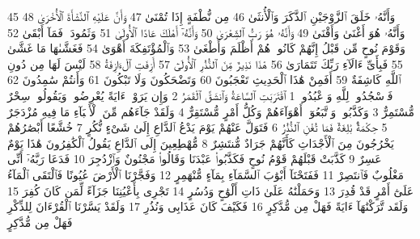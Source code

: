 {\tiny\colorbox{cl_aya}{45}} وَأَنَّهُۥ خَلَقَ ٱلزَّوْجَيْنِ ٱلذَّكَرَ وَٱلْأُنثَىٰ
{\tiny\colorbox{cl_aya}{46}} مِن نُّطْفَةٍ إِذَا تُمْنَىٰ
{\tiny\colorbox{cl_aya}{47}} وَأَنَّ عَلَيْهِ ٱلنَّشْأَةَ ٱلْأُخْرَىٰ
{\tiny\colorbox{cl_aya}{48}} وَأَنَّهُۥ هُوَ أَغْنَىٰ وَأَقْنَىٰ
{\tiny\colorbox{cl_aya}{49}} وَأَنَّهُۥ هُوَ رَبُّ ٱلشِّعْرَىٰ
{\tiny\colorbox{cl_aya}{50}} وَأَنَّهُۥٓ أَهْلَكَ عَادًا ٱلْأُولَىٰ
{\tiny\colorbox{cl_aya}{51}} وَثَمُودَا۟ فَمَآ أَبْقَىٰ
{\tiny\colorbox{cl_aya}{52}} وَقَوْمَ نُوحٍ مِّن قَبْلُ إِنَّهُمْ كَانُوا۟ هُمْ أَظْلَمَ وَأَطْغَىٰ
{\tiny\colorbox{cl_aya}{53}} وَٱلْمُؤْتَفِكَةَ أَهْوَىٰ
{\tiny\colorbox{cl_aya}{54}} فَغَشَّىٰهَا مَا غَشَّىٰ
{\tiny\colorbox{cl_aya}{55}} فَبِأَىِّ ءَالَآءِ رَبِّكَ تَتَمَارَىٰ
{\tiny\colorbox{cl_aya}{56}} هَٰذَا نَذِيرٌ مِّنَ ٱلنُّذُرِ ٱلْأُولَىٰٓ
{\tiny\colorbox{cl_aya}{57}} أَزِفَتِ ٱلْءَازِفَةُ
{\tiny\colorbox{cl_aya}{58}} لَيْسَ لَهَا مِن دُونِ ٱللَّهِ كَاشِفَةٌ
{\tiny\colorbox{cl_aya}{59}} أَفَمِنْ هَٰذَا ٱلْحَدِيثِ تَعْجَبُونَ
{\tiny\colorbox{cl_aya}{60}} وَتَضْحَكُونَ وَلَا تَبْكُونَ
{\tiny\colorbox{cl_aya}{61}} وَأَنتُمْ سَٰمِدُونَ
{\tiny\colorbox{cl_aya}{62}} فَٱسْجُدُوا۟ لِلَّهِ وَٱعْبُدُوا۟
{\tiny\colorbox{cl_aya}{1}} ٱقْتَرَبَتِ ٱلسَّاعَةُ وَٱنشَقَّ ٱلْقَمَرُ
{\tiny\colorbox{cl_aya}{2}} وَإِن يَرَوْا۟ ءَايَةً يُعْرِضُوا۟ وَيَقُولُوا۟ سِحْرٌ مُّسْتَمِرٌّ
{\tiny\colorbox{cl_aya}{3}} وَكَذَّبُوا۟ وَٱتَّبَعُوٓا۟ أَهْوَآءَهُمْ وَكُلُّ أَمْرٍ مُّسْتَقِرٌّ
{\tiny\colorbox{cl_aya}{4}} وَلَقَدْ جَآءَهُم مِّنَ ٱلْأَنۢبَآءِ مَا فِيهِ مُزْدَجَرٌ
{\tiny\colorbox{cl_aya}{5}} حِكْمَةٌۢ بَٰلِغَةٌ فَمَا تُغْنِ ٱلنُّذُرُ
{\tiny\colorbox{cl_aya}{6}} فَتَوَلَّ عَنْهُمْ يَوْمَ يَدْعُ ٱلدَّاعِ إِلَىٰ شَىْءٍ نُّكُرٍ
{\tiny\colorbox{cl_aya}{7}} خُشَّعًا أَبْصَٰرُهُمْ يَخْرُجُونَ مِنَ ٱلْأَجْدَاثِ كَأَنَّهُمْ جَرَادٌ مُّنتَشِرٌ
{\tiny\colorbox{cl_aya}{8}} مُّهْطِعِينَ إِلَى ٱلدَّاعِ يَقُولُ ٱلْكَٰفِرُونَ هَٰذَا يَوْمٌ عَسِرٌ
{\tiny\colorbox{cl_aya}{9}} كَذَّبَتْ قَبْلَهُمْ قَوْمُ نُوحٍ فَكَذَّبُوا۟ عَبْدَنَا وَقَالُوا۟ مَجْنُونٌ وَٱزْدُجِرَ
{\tiny\colorbox{cl_aya}{10}} فَدَعَا رَبَّهُۥٓ أَنِّى مَغْلُوبٌ فَٱنتَصِرْ
{\tiny\colorbox{cl_aya}{11}} فَفَتَحْنَآ أَبْوَٰبَ ٱلسَّمَآءِ بِمَآءٍ مُّنْهَمِرٍ
{\tiny\colorbox{cl_aya}{12}} وَفَجَّرْنَا ٱلْأَرْضَ عُيُونًا فَٱلْتَقَى ٱلْمَآءُ عَلَىٰٓ أَمْرٍ قَدْ قُدِرَ
{\tiny\colorbox{cl_aya}{13}} وَحَمَلْنَٰهُ عَلَىٰ ذَاتِ أَلْوَٰحٍ وَدُسُرٍ
{\tiny\colorbox{cl_aya}{14}} تَجْرِى بِأَعْيُنِنَا جَزَآءً لِّمَن كَانَ كُفِرَ
{\tiny\colorbox{cl_aya}{15}} وَلَقَد تَّرَكْنَٰهَآ ءَايَةً فَهَلْ مِن مُّدَّكِرٍ
{\tiny\colorbox{cl_aya}{16}} فَكَيْفَ كَانَ عَذَابِى وَنُذُرِ
{\tiny\colorbox{cl_aya}{17}} وَلَقَدْ يَسَّرْنَا ٱلْقُرْءَانَ لِلذِّكْرِ فَهَلْ مِن مُّدَّكِرٍ
